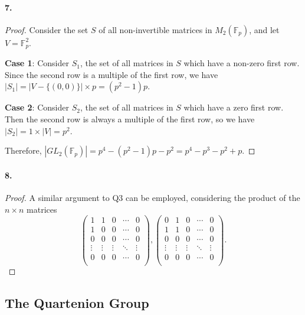 \documentclass{article}
\begin{document}
\paragraph{7.}
\begin{proof}
  Consider the set $S$ of all non-invertible matrices in $M_2(\mathbb{F}_p)$,
  and let $V = \mathbb{F}_p^2$.

  \textbf{Case 1}: Consider $S_1$, the set of all matrices in $S$ which have a
  non-zero first row. Since the second row is a multiple of the first row, we
  have $|S_1| = |V - \{(0, 0)\}| \times p = (p^2 - 1)p$.

  \textbf{Case 2}: Consider $S_2$, the set of all matrices in $S$ which have a
  zero first row. Then the second row is always a multiple of the first row, so
  we have $|S_2| = 1 \times |V| = p^2$.

  Therefore, $|GL_2(\mathbb{F}_p)| = p^4 - (p^2 - 1)p - p^2 = p^4 - p^3 - p^2 +
  p$.
\end{proof}

\paragraph{8.}
\begin{proof}
  A similar argument to Q3 can be employed, considering the product of the
  $n \times n$ matrices \[
    \begin{pmatrix}
      1 & 1 & 0 & \cdots & 0 \\
      1 & 0 & 0 & \cdots & 0 \\
      0 & 0 & 0 & \cdots & 0 \\
      \vdots & \vdots & \vdots & \ddots & \vdots \\
      0 & 0 & 0 & \cdots & 0 \\
    \end{pmatrix},
    \begin{pmatrix}
      0 & 1 & 0 & \cdots & 0 \\
      1 & 1 & 0 & \cdots & 0 \\
      0 & 0 & 0 & \cdots & 0 \\
      \vdots & \vdots & \vdots & \ddots & \vdots \\
      0 & 0 & 0 & \cdots & 0 \\
    \end{pmatrix}.
  \]
\end{proof}

\subsection{The Quartenion Group}
\end{document}
